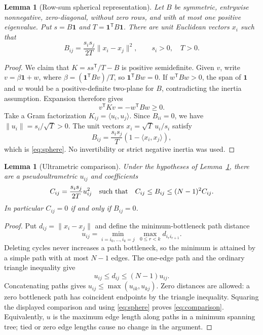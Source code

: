 \documentclass[11pt]{article}
\newtheorem{lemma}[theorem]{Lemma}
\theoremstyle{remark}
\newcommand{\one}{\mathbf{1}}
\begin{document}
\begin{lemma}[Row-sum spherical representation]
\label{lem:sphere}
Let $B$ be symmetric, entrywise nonnegative, zero-diagonal, without zero
rows, and with at most one positive eigenvalue.  Put
$s=B\one$ and $T=\one^{\mathsf T}B\one$.  There are unit Euclidean vectors
$x_i$ such that
\begin{equation}
 B_{ij}=\frac{s_is_j}{2T}\|x_i-x_j\|^2,
 \qquad s_i>0,\quad T>0.
 \label{eq:sphere}
\end{equation}
\end{lemma}

\begin{proof}
We claim that $K=ss^{\mathsf T}/T-B$ is positive semidefinite.  Given $v$,
write $v=\beta\one+w$, where $\beta=(\one^{\mathsf T}Bv)/T$, so
$\one^{\mathsf T}Bw=0$.  If $w^{\mathsf T}Bw>0$, the span of $\one$ and $w$
would be a positive-definite two-plane for $B$, contradicting the inertia
assumption.  Expansion therefore gives
\[
 v^{\mathsf T}Kv=-w^{\mathsf T}Bw\geq0.
\]
Take a Gram factorization $K_{ij}=\langle u_i,u_j\rangle$.
Since $B_{ii}=0$, we have $\|u_i\|=s_i/\sqrt T>0$.
The unit vectors $x_i=\sqrt T\,u_i/s_i$ satisfy
\[
 B_{ij}=\frac{s_is_j}{T}(1-\langle x_i,x_j\rangle),
\]
which is \eqref{eq:sphere}.  No invertibility or strict negative inertia
was used.
\end{proof}

\begin{lemma}[Ultrametric comparison]
\label{lem:ultrametric}
Under the hypotheses of Lemma~\ref{lem:sphere}, there are a
pseudoultrametric $u_{ij}$ and coefficients
\begin{equation}
 C_{ij}=\frac{s_is_j}{2T}u_{ij}^2
 \quad\hbox{such that}\quad
 C_{ij}\leq B_{ij}\leq(N-1)^2C_{ij}.
 \label{eq:comparison}
\end{equation}
In particular $C_{ij}=0$ if and only if $B_{ij}=0$.
\end{lemma}

\begin{proof}
Put $d_{ij}=\|x_i-x_j\|$ and define the minimum-bottleneck path distance
\[
 u_{ij}=\min_{i=i_0,\ldots,i_k=j}\,
             \max_{0\leq r<k}d_{i_ri_{r+1}}.
\]
Deleting cycles never increases a path bottleneck, so the minimum is
attained by a simple path with at most $N-1$ edges.  The one-edge path and
the ordinary triangle inequality give
\[
 u_{ij}\leq d_{ij}\leq(N-1)u_{ij}.
\]
Concatenating paths gives
$u_{ij}\leq\max(u_{ik},u_{kj})$.  Zero distances are allowed: a zero
bottleneck path has coincident endpoints by the triangle inequality.
Squaring the displayed comparison and using \eqref{eq:sphere} proves
\eqref{eq:comparison}.  Equivalently, $u$ is the maximum edge length along
paths in a minimum spanning tree; tied or zero edge lengths cause no change
in the argument.
\end{proof}
\end{document}
